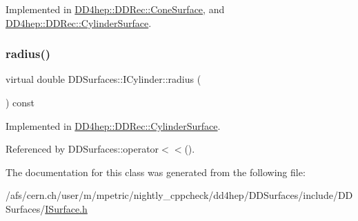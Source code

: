 Implemented in \hyperlink{class_d_d4hep_1_1_d_d_rec_1_1_cone_surface_ad3fe5b411845bd6985c049e703351843}{D\+D4hep\+::\+D\+D\+Rec\+::\+Cone\+Surface}, and \hyperlink{class_d_d4hep_1_1_d_d_rec_1_1_cylinder_surface_a8043392b62836fcf8f4f0eca596721c9}{D\+D4hep\+::\+D\+D\+Rec\+::\+Cylinder\+Surface}.

\hypertarget{class_d_d_surfaces_1_1_i_cylinder_a66bc9b90cdb121938eff646b2fd21385}{}\label{class_d_d_surfaces_1_1_i_cylinder_a66bc9b90cdb121938eff646b2fd21385} 
\subsubsection{\texorpdfstring{radius()}{radius()}}
{\footnotesize\ttfamily virtual double D\+D\+Surfaces\+::\+I\+Cylinder\+::radius (\begin{DoxyParamCaption}{ }\end{DoxyParamCaption}) const\hspace{0.3cm}{\ttfamily [pure virtual]}}



Implemented in \hyperlink{class_d_d4hep_1_1_d_d_rec_1_1_cylinder_surface_a182ce2551b39f698df854755aa070066}{D\+D4hep\+::\+D\+D\+Rec\+::\+Cylinder\+Surface}.



Referenced by D\+D\+Surfaces\+::operator$<$$<$().



The documentation for this class was generated from the following file\+:\begin{DoxyCompactItemize}
\item 
/afs/cern.\+ch/user/m/mpetric/nightly\+\_\+cppcheck/dd4hep/\+D\+D\+Surfaces/include/\+D\+D\+Surfaces/\hyperlink{_i_surface_8h}{I\+Surface.\+h}\end{DoxyCompactItemize}
